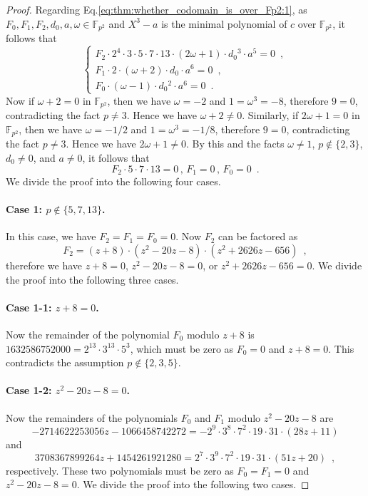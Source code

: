 \documentclass[10pt,a4paper]{amsart}
\newcommand{\FF}{\mathbb{F}}
\begin{document}
\begin{proof}
Regarding Eq.\eqref{eq:thm:whether_codomain_is_over_Fp2:1}, as $F_0,F_1,F_2,d_0,a,\omega \in \FF_{p^2}$ and $X^3 - a$ is the minimal polynomial of $c$ over $\FF_{p^2}$, it follows that
\[
\begin{cases}
F_2 \cdot 2^4 \cdot 3 \cdot 5 \cdot 7 \cdot 13 \cdot (2 \omega + 1) \cdot d_0{}^3 \cdot a^5 = 0 \enspace,\\
F_1 \cdot 2 \cdot (\omega + 2) \cdot d_0 \cdot a^6 = 0 \enspace,\\
F_0 \cdot (\omega - 1) \cdot d_0{}^2 \cdot a^6 = 0 \enspace.
\end{cases}
\]
Now if $\omega + 2 = 0$ in $\FF_{p^2}$, then we have $\omega = -2$ and $1 = \omega^3 = -8$, therefore $9 = 0$, contradicting the fact $p \neq 3$.
Hence we have $\omega + 2 \neq 0$.
Similarly, if $2 \omega + 1 = 0$ in $\FF_{p^2}$, then we have $\omega = -1/2$ and $1 = \omega^3 = -1/8$, therefore $9 = 0$, contradicting the fact $p \neq 3$.
Hence we have $2 \omega + 1 \neq 0$.
By this and the facts $\omega \neq 1$, $p \not\in \{2,3\}$, $d_0 \neq 0$, and $a \neq 0$, it follows that
\[
F_2 \cdot 5 \cdot 7 \cdot 13 = 0 \,,\,
F_1 = 0 \,,\,
F_0 = 0 \enspace.
\]
We divide the proof into the following four cases.

\paragraph{Case 1: $p \not\in \{5,7,13\}$.}

In this case, we have $F_2 = F_1 = F_0 = 0$.
Now $F_2$ can be factored as
\[
F_2 = (z + 8) \cdot (z^2 - 20 z - 8) \cdot (z^2 + 2626 z - 656) \enspace,
\]
therefore we have $z + 8 = 0$, $z^2 - 20 z - 8 = 0$, or $z^2 + 2626 z - 656 = 0$.
We divide the proof into the following three cases.

\paragraph{Case 1-1: $z + 8 = 0$.}

Now the remainder of the polynomial $F_0$ modulo $z + 8$ is $1632586752000 = 2^{13} \cdot 3^{13} \cdot 5^3$, which must be zero as $F_0 = 0$ and $z + 8 = 0$.
This contradicts the assumption $p \not\in \{2,3,5\}$.

\paragraph{Case 1-2: $z^2 - 20 z - 8 = 0$.}

Now the remainders of the polynomials $F_0$ and $F_1$ modulo $z^2 - 20 z - 8$ are
\[
-2714622253056 z - 1066458742272
= -2^9 \cdot 3^8 \cdot 7^2 \cdot 19 \cdot 31 \cdot (28 z + 11)
\]
and
\[
3708367899264 z + 1454261921280
= 2^7 \cdot 3^9 \cdot 7^2 \cdot 19 \cdot 31 \cdot (51 z + 20) \enspace,
\]
respectively.
These two polynomials must be zero as $F_0 = F_1 = 0$ and $z^2 - 20 z - 8 = 0$.
We divide the proof into the following two cases.


\end{proof}
\end{document}
